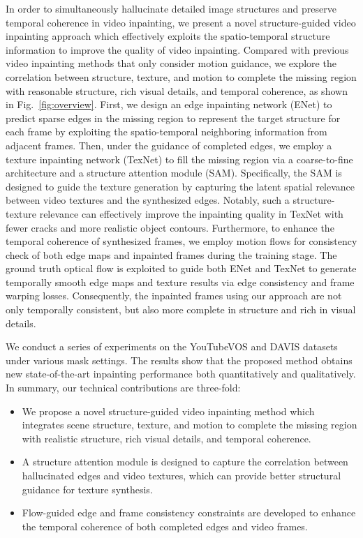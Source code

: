 In order to simultaneously hallucinate detailed image structures and preserve temporal coherence in video inpainting, we present a novel structure-guided video inpainting approach which effectively exploits the spatio-temporal structure information to improve the quality of video inpainting.  
%
Compared with previous video inpainting methods that only consider motion guidance, we explore the correlation between structure, texture, and motion to complete the missing region with reasonable structure, rich visual details, and temporal coherence, as shown in Fig.~\ref{fig:overview}.
First, we design an edge inpainting network (ENet) to predict sparse edges in the missing region to represent the target structure for each frame by exploiting the spatio-temporal neighboring information from adjacent frames.
Then, under the guidance of completed edges, we employ a texture inpainting network (TexNet) to fill the missing region via a coarse-to-fine architecture and a structure attention module (SAM).
Specifically, the SAM is designed to guide the texture generation by capturing the latent spatial relevance between video textures and the synthesized edges.
Notably, such a structure-texture relevance can effectively improve the inpainting quality in TexNet with fewer cracks and more realistic object contours.
Furthermore, to enhance the temporal coherence of synthesized frames, we employ motion flows for consistency check of both edge maps and inpainted frames during the training stage.
%
The ground truth optical flow is exploited to guide both ENet and TexNet to generate temporally smooth edge maps and texture results via edge consistency and frame warping losses.
Consequently, the inpainted frames using our approach are not only temporally consistent, but also more complete in structure and rich in visual details.
 

%
We conduct a series of experiments on the YouTubeVOS and DAVIS datasets under various mask settings. 
The results show that the proposed method obtains new state-of-the-art inpainting performance both quantitatively and qualitatively. 
In summary, our technical contributions are three-fold:
\begin{itemize}
	\item We propose a novel structure-guided video inpainting method which integrates scene structure, texture, and motion to complete the missing region with realistic structure, rich visual details, and temporal coherence.
	\item A structure attention module is designed to capture the correlation between hallucinated edges and video textures, which can provide better structural guidance for texture synthesis. %
	\item Flow-guided edge and frame consistency constraints are developed to enhance the temporal coherence of both completed edges and video frames.   
\end{itemize}


